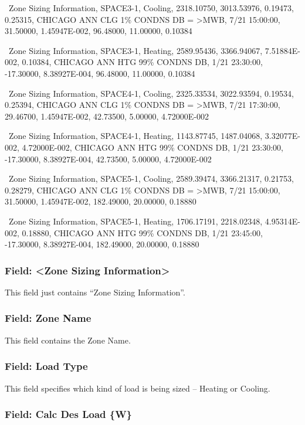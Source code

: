 ~Zone Sizing Information, SPACE3-1, Cooling, 2318.10750, 3013.53976, 0.19473, 0.25315, CHICAGO ANN CLG 1\% CONDNS DB = \textgreater{}MWB, 7/21 15:00:00, 31.50000, 1.45947E-002, 96.48000, 11.00000, 0.10384

~Zone Sizing Information, SPACE3-1, Heating, 2589.95436, 3366.94067, 7.51884E-002, 0.10384, CHICAGO ANN HTG 99\% CONDNS DB, 1/21 23:30:00, -17.30000, 8.38927E-004, 96.48000, 11.00000, 0.10384

~Zone Sizing Information, SPACE4-1, Cooling, 2325.33534, 3022.93594, 0.19534, 0.25394, CHICAGO ANN CLG 1\% CONDNS DB = \textgreater{}MWB, 7/21 17:30:00, 29.46700, 1.45947E-002, 42.73500, 5.00000, 4.72000E-002

~Zone Sizing Information, SPACE4-1, Heating, 1143.87745, 1487.04068, 3.32077E-002, 4.72000E-002, CHICAGO ANN HTG 99\% CONDNS DB, 1/21 23:30:00, -17.30000, 8.38927E-004, 42.73500, 5.00000, 4.72000E-002

~Zone Sizing Information, SPACE5-1, Cooling, 2589.39474, 3366.21317, 0.21753, 0.28279, CHICAGO ANN CLG 1\% CONDNS DB = \textgreater{}MWB, 7/21 15:00:00, 31.50000, 1.45947E-002, 182.49000, 20.00000, 0.18880

~Zone Sizing Information, SPACE5-1, Heating, 1706.17191, 2218.02348, 4.95314E-002, 0.18880, CHICAGO ANN HTG 99\% CONDNS DB, 1/21 23:45:00, -17.30000, 8.38927E-004, 182.49000, 20.00000, 0.18880

\subsubsection{Field: \textless{}Zone Sizing Information\textgreater{}}\label{field-zone-sizing-information}

This field just contains ``Zone Sizing Information''.

\subsubsection{Field: Zone Name}\label{field-zone-name-11}

This field contains the Zone Name.

\subsubsection{Field: Load Type}\label{field-load-type}

This field specifies which kind of load is being sized -- Heating or Cooling.

\subsubsection{Field: Calc Des Load \{W\}}\label{field-calc-des-load-w}

